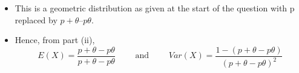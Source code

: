 \documentclass[a4paper,12pt]{article}
\begin{document}
\begin{enumerate}
\begin{itemize}
\item This is a geometric distribution as given at the start of the question with p replaced by
$p + θ – p \theta$. 
\item Hence, from part (ii),
\[ E(X) = \frac{p+\theta - p\theta}{p+\theta-p \theta} \qquad \mbox{ and }\qquad Var(X) = \frac{1- (p+\theta - p\theta)}{(p+\theta-p \theta)^2}\]
\end{itemize}

\end{enumerate}
\end{document}

